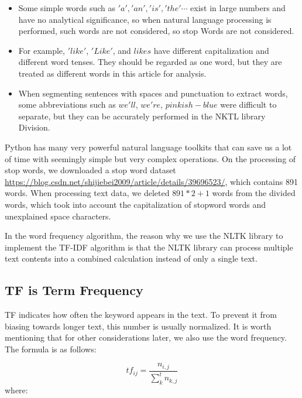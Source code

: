 \documentclass[UTF8]{article}
\begin{document}
\begin{itemize}

	\item Some simple words such as $'a', 'an', 'is', 'the' \cdots$ exist in large numbers and have no analytical significance, so when natural language processing is performed, such words are not considered, so stop Words are not considered.

	\item For example, $'like'$, $'Like'$, and $likes$ have different capitalization and different word tenses. They should be regarded as one word, but they are treated as different words in this article for analysis.

	\item When segmenting sentences with spaces and punctuation to extract words, some abbreviations such as $we'll$, $we're$, $pinkish-blue$ were difficult to separate, but they can be accurately performed in the NKTL library Division.

\end{itemize}

Python has many very powerful natural language toolkits that can save us a lot of time with seemingly simple but very complex operations. On the processing of stop words, we downloaded a stop word dataset \url{https://blog.csdn.net/shijiebei2009/article/details/39696523/}, which contains 891 words. When processing text data, we deleted $891 * 2 + 1$ words from the divided words, which took into account the capitalization of stopword words and unexplained space characters.

In the word frequency algorithm, the reason why we use the NLTK library to implement the TF-IDF algorithm is that the NLTK library can process multiple text contents into a combined calculation instead of only a single text.

\subsection{TF is Term Frequency}

TF indicates how often the keyword appears in the text. To prevent it from biasing towards longer text, this number is usually normalized. It is worth mentioning that for other considerations later, we also use the word frequency. The formula is as follows:

\begin{equation}
t f_{i j}=\frac{n_{i, j}}{\sum_{k}^t n_{k, j}}
\end{equation}
where:
\end{document}
